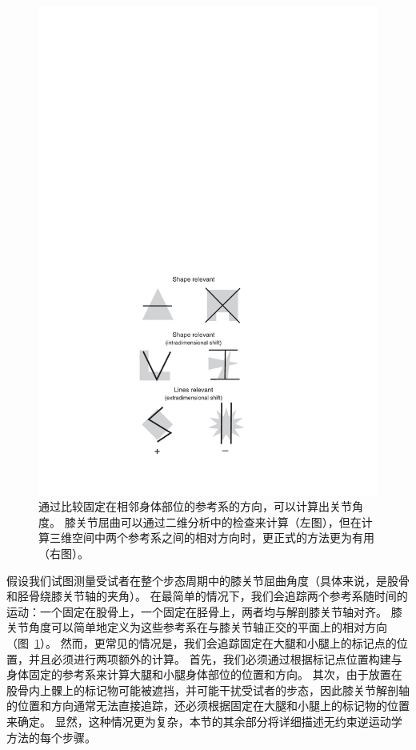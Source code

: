 \begin{figure}[!htb]
	\centering
	\includegraphics[width=1.0\linewidth]{chap7/7_10}
	\caption{通过比较固定在相邻身体部位的参考系的方向，可以计算出关节角度。
		膝关节屈曲可以通过二维分析中的检查来计算（左图），但在计算三维空间中两个参考系之间的相对方向时，更正式的方法更为有用（右图）。 \label{fig:7_10}}
\end{figure}


假设我们试图测量受试者在整个步态周期中的膝关节屈曲角度（具体来说，是股骨和胫骨绕膝关节轴的夹角）。
在最简单的情况下，我们会追踪两个参考系随时间的运动：一个固定在股骨上，一个固定在胫骨上，两者均与解剖膝关节轴对齐。
膝关节角度可以简单地定义为这些参考系在与膝关节轴正交的平面上的相对方向（图~\ref{fig:7_10}）。
然而，更常见的情况是，我们会追踪固定在大腿和小腿上的标记点的位置，并且必须进行两项额外的计算。
首先，我们必须通过根据标记点位置构建与身体固定的参考系来计算大腿和小腿身体部位的位置和方向。
其次，由于放置在股骨内上髁上的标记物可能被遮挡，并可能干扰受试者的步态，因此膝关节解剖轴的位置和方向通常无法直接追踪，还必须根据固定在大腿和小腿上的标记物的位置来确定。
显然，这种情况更为复杂，本节的其余部分将详细描述无约束逆运动学方法的每个步骤。


